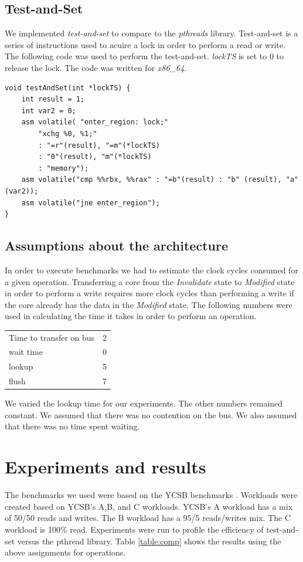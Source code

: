 \documentclass{article}
\begin{document}
\subsection{Test-and-Set}
We implemented \emph{test-and-set} to compare to the \emph{pthreads} library.
Test-and-set is a series of instructions used to acuire a lock in order to perform a read or write.
The following code was used to perform the test-and-set.
\emph{lockTS} is set to 0 to release the lock.
The code was written for \emph{x86\_64}.

\begin{verbatim}
void testAndSet(int *lockTS) {
    int result = 1;
    int var2 = 0;
    asm volatile( "enter_region: lock;"
        "xchg %0, %1;"
        : "=r"(result), "=m"(*lockTS)
        : "0"(result), "m"(*lockTS)
        : "memory");
    asm volatile("cmp %%rbx, %%rax" : "=b"(result) : "b" (result), "a" (var2));
    asm volatile("jne enter_region");
}
\end{verbatim}

\subsection{Assumptions about the architecture}
In order to execute benchmarks we had to estimate the clock cycles consumed for a given operation.
Transferring a core from the \emph{Invalidate} state to \emph{Modified} state in order to perform a write requires more clock cycles than performing a write if the core already has the data in the \emph{Modified} state.
The following numbers were used in calculating the time it takes in order to perform an operation.

\begin{center}
\begin{tabular}{lc}
Time to transfer on bus & 2\\
wait time & 0\\
lookup & 5\\
flush & 7\\
\end{tabular}
\end{center}

We varied the lookup time for our experiments.  The other numbers remained constant. 
We assumed that there was no contention on the bus.
We also assumed that there was no time spent waiting.

\section{Experiments and results}\label{sec:results}
The benchmarks we used were based on the YCSB benchmarks \cite{ycsb}.
Workloads were created based on YCSB's A,B, and C workloads.
YCSB's A workload has a mix of 50/50 reads and writes.
The B workload has a 95/5 reads/writes mix.
The C workload is 100\% read.
Experiments were run to profile the efficiency of test-and-set versus the pthread library.
Table \ref{table:comp} shows the results using the above assignments for operations.
\end{document}

